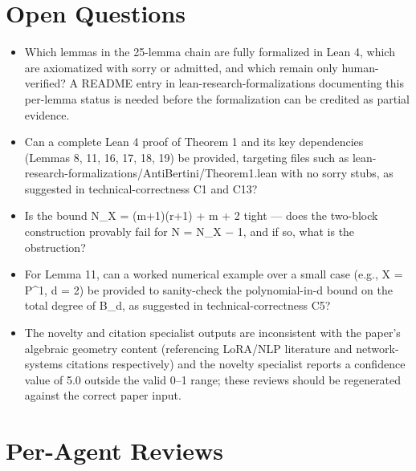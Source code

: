 \documentclass[11pt]{article}
\begin{document}
\section*{Open Questions}
\begin{itemize}[leftmargin=*]
  \item Which lemmas in the 25-lemma chain are fully formalized in Lean 4, which are axiomatized with sorry or admitted, and which remain only human-verified? A README entry in lean-research-formalizations documenting this per-lemma status is needed before the formalization can be credited as partial evidence.
  \item Can a complete Lean 4 proof of Theorem 1 and its key dependencies (Lemmas 8, 11, 16, 17, 18, 19) be provided, targeting files such as lean-research-formalizations/AntiBertini/Theorem1.lean with no sorry stubs, as suggested in technical-correctness C1 and C13?
  \item Is the bound N\_X = (m+1)(r+1) + m + 2 tight --- does the two-block construction provably fail for N = N\_X \ensuremath{-} 1, and if so, what is the obstruction?
  \item For Lemma 11, can a worked numerical example over a small case (e.g., X = P\^{}1, d = 2) be provided to sanity-check the polynomial-in-d bound on the total degree of B\_d, as suggested in technical-correctness C5?
  \item The novelty and citation specialist outputs are inconsistent with the paper's algebraic geometry content (referencing LoRA/NLP literature and network-systems citations respectively) and the novelty specialist reports a confidence value of 5.0 outside the valid 0--1 range; these reviews should be regenerated against the correct paper input.
\end{itemize}

\section*{Per-Agent Reviews}
\end{document}
